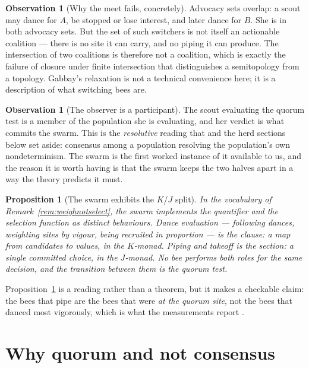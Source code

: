 \documentclass[11pt,a4paper]{article}
\theoremstyle{plain}
\newtheorem{proposition}[theorem]{Proposition}
\theoremstyle{definition}
\newtheorem{observation}[theorem]{Observation}
\theoremstyle{remark}
\begin{document}
\begin{observation}[Why the meet fails, concretely]\label{obs:switchers}
Advocacy sets overlap: a scout may dance for $A$, be stopped or lose interest,
and later dance for $B$. She is in both advocacy sets. But the set of such
switchers is not itself an actionable coalition --- there is no site it can
carry, and no piping it can produce. The intersection of two coalitions is
therefore not a coalition, which is exactly the failure of closure under finite
intersection that distinguishes a semitopology from a topology. Gabbay's
relaxation is not a technical convenience here; it is a description of what
switching bees are.
\end{observation}

\begin{observation}[The observer is a participant]\label{obs:inside}
The scout evaluating the quorum test is a member of the population she is
evaluating, and her verdict is what commits the swarm. This is the
\emph{resolutive} reading that \cite{gradedwhere,choicef} and the herd sections
below set aside: consensus among a population resolving the population's own
nondeterminism. The swarm is the first worked instance of it available to us,
and the reason it is worth having is that the swarm keeps the two halves apart
in a way the theory predicts it must.
\end{observation}

\begin{proposition}[The swarm exhibits the $K$/$J$ split]\label{prop:kjsplit}
In the vocabulary of Remark~\ref{rem:weighnotselect}, the swarm implements the
quantifier and the selection function as distinct behaviours. Dance evaluation
--- following dances, weighting sites by vigour, being recruited in proportion
--- is the clause: a map from candidates to values, in the $K$-monad. Piping
and takeoff is the section: a single committed choice, in the $J$-monad. No bee
performs both roles for the same decision, and the transition between them is
the quorum test.
\end{proposition}

Proposition~\ref{prop:kjsplit} is a reading rather than a theorem, but it makes
a checkable claim: the bees that pipe are the bees that were \emph{at the
quorum site}, not the bees that danced most vigorously, which is what the
measurements report \cite{VS07}.

\section{Why quorum and not consensus}\label{sec:whyquorum}
\end{document}
